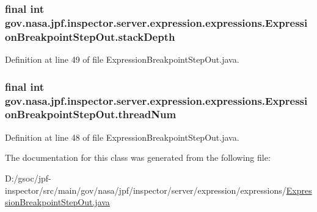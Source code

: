 \subsubsection[{\texorpdfstring{stack\+Depth}{stackDepth}}]{\setlength{\rightskip}{0pt plus 5cm}final int gov.\+nasa.\+jpf.\+inspector.\+server.\+expression.\+expressions.\+Expression\+Breakpoint\+Step\+Out.\+stack\+Depth\hspace{0.3cm}{\ttfamily [private]}}\hypertarget{classgov_1_1nasa_1_1jpf_1_1inspector_1_1server_1_1expression_1_1expressions_1_1_expression_breakpoint_step_out_a1bee35b7dd22e687b0e2f3a0c2a3402d}{}\label{classgov_1_1nasa_1_1jpf_1_1inspector_1_1server_1_1expression_1_1expressions_1_1_expression_breakpoint_step_out_a1bee35b7dd22e687b0e2f3a0c2a3402d}


Definition at line 49 of file Expression\+Breakpoint\+Step\+Out.\+java.

\subsubsection[{\texorpdfstring{thread\+Num}{threadNum}}]{\setlength{\rightskip}{0pt plus 5cm}final int gov.\+nasa.\+jpf.\+inspector.\+server.\+expression.\+expressions.\+Expression\+Breakpoint\+Step\+Out.\+thread\+Num\hspace{0.3cm}{\ttfamily [private]}}\hypertarget{classgov_1_1nasa_1_1jpf_1_1inspector_1_1server_1_1expression_1_1expressions_1_1_expression_breakpoint_step_out_a26bade410d323cf7876faa4dc9ef28c4}{}\label{classgov_1_1nasa_1_1jpf_1_1inspector_1_1server_1_1expression_1_1expressions_1_1_expression_breakpoint_step_out_a26bade410d323cf7876faa4dc9ef28c4}


Definition at line 48 of file Expression\+Breakpoint\+Step\+Out.\+java.



The documentation for this class was generated from the following file\+:\begin{DoxyCompactItemize}
\item 
D\+:/gsoc/jpf-\/inspector/src/main/gov/nasa/jpf/inspector/server/expression/expressions/\hyperlink{_expression_breakpoint_step_out_8java}{Expression\+Breakpoint\+Step\+Out.\+java}\end{DoxyCompactItemize}
